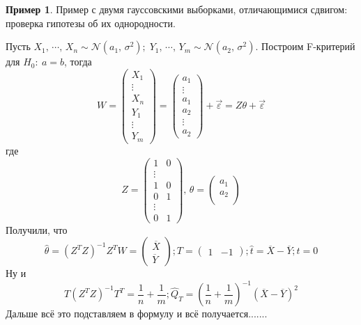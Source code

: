 \documentclass[a4paper,12pt]{article}
\theoremstyle{plain}
\theoremstyle{definition}
\newtheorem*{example}{Пример}
\theoremstyle{remark}
\begin{document}
\begin{example}
  Пример с двумя гауссовскими выборками, отличающимися сдвигом: проверка гипотезы об их
  однородности.

  Пусть $X_1,\,\cdots,\,X_n \sim \mathcal{N}(a_1,\, \sigma^2);\; Y_1,\,\cdots,\,Y_m \sim \mathcal{N}(a_2,\, \sigma^2)$. Построим F-критерий для $H_0 :\: a = b$, тогда
  \[
    W = \begin{pmatrix}
      X_1\\
      \vdots\\
      X_n\\
      Y_1\\
      \vdots\\
      Y_m
    \end{pmatrix} = \begin{pmatrix}
      a_1\\
      \vdots\\
      a_1\\
      a_2\\
      \vdots\\
      a_2
    \end{pmatrix} + \vec{\varepsilon} = Z\theta + \vec{\varepsilon}
  \]
  где 
  \[
    Z = \begin{pmatrix}
      1 & 0\\
      \vdots\\
      1 & 0\\
      0 & 1\\
      \vdots\\
      0 & 1
    \end{pmatrix},\, \theta = \begin{pmatrix}
      a_1\\
      a_2\\
    \end{pmatrix}
  \]
  Получили, что
  \[
    \hat{\theta} = (Z^TZ)^{-1}Z^TW = \begin{pmatrix}
      \overline{X}\\
      \overline{Y}
    \end{pmatrix}; T = \begin{pmatrix}
      1 & -1
    \end{pmatrix}; \hat{t} = \overline{X} - \overline{Y}; t = 0
  \]
  Ну и 
  \[
    T(Z^TZ)^{-1}T^T = \frac{1}{n} + \frac{1}{m}; \hat{Q}_T = \left(\frac{1}{n} + \frac{1}{m}\right)^{-1}(\overline{X} - \overline{Y})^2
  \]
  Дальше всё это подставляем в формулу и всё получается.......
\end{example}
\end{document}
